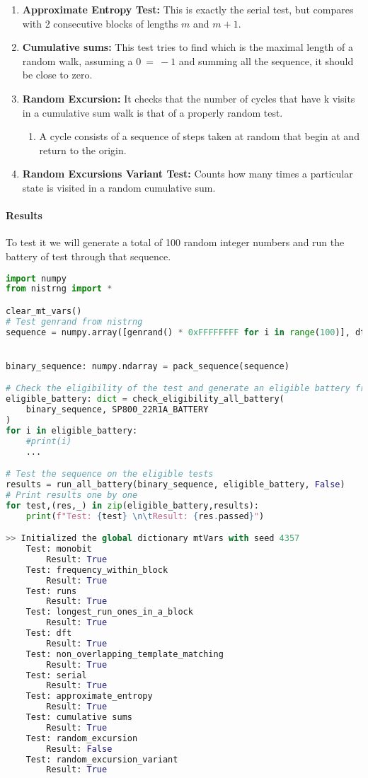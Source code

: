 \begin{enumerate}
\item  \textbf{Approximate Entropy Test: }This is exactly the serial test, but compares with 2 consecutive blocks of lengths $m$ and $m+1$.

\item \textbf{ Cumulative sums: }This test tries to find which is the maximal length of a random walk, assuming a $0\ =\ -1$ and summing all the sequence, it should be close to zero.

\item \textbf{ Random Excursion: }It checks that the number of cycles that have k visits in a cumulative sum walk is that of a properly random test.

\begin{enumerate}
\item A cycle consists of a sequence of steps taken at random that begin at and return to the origin.
\end{enumerate}

\item \textbf{ Random Excursions Variant Test: }Counts how many times a particular state is visited in a random cumulative sum.
\end{enumerate}

\paragraph{Results}
To test it we will generate a total of 100 random integer numbers and run the battery of test through that sequence.
\begin{lstlisting}[language=Python]
import numpy
from nistrng import *

clear_mt_vars()
# Test genrand from nistrng
sequence = numpy.array([genrand() * 0xFFFFFFFF for i in range(100)], dtype=numpy.uint64)


binary_sequence: numpy.ndarray = pack_sequence(sequence)

# Check the eligibility of the test and generate an eligible battery from the default NIST-sp800-22r1a battery
eligible_battery: dict = check_eligibility_all_battery(
    binary_sequence, SP800_22R1A_BATTERY
)
for i in eligible_battery:
    #print(i)
    ...

# Test the sequence on the eligible tests
results = run_all_battery(binary_sequence, eligible_battery, False)
# Print results one by one
for test,(res,_) in zip(eligible_battery,results):
    print(f"Test: {test} \n\tResult: {res.passed}")

>> Initialized the global dictionary mtVars with seed 4357
    Test: monobit 
    	Result: True
    Test: frequency_within_block 
    	Result: True
    Test: runs 
    	Result: True
    Test: longest_run_ones_in_a_block 
    	Result: True
    Test: dft 
    	Result: True
    Test: non_overlapping_template_matching 
    	Result: True
    Test: serial 
    	Result: True
    Test: approximate_entropy 
    	Result: True
    Test: cumulative sums 
    	Result: True
    Test: random_excursion 
    	Result: False
    Test: random_excursion_variant 
    	Result: True
\end{lstlisting}

